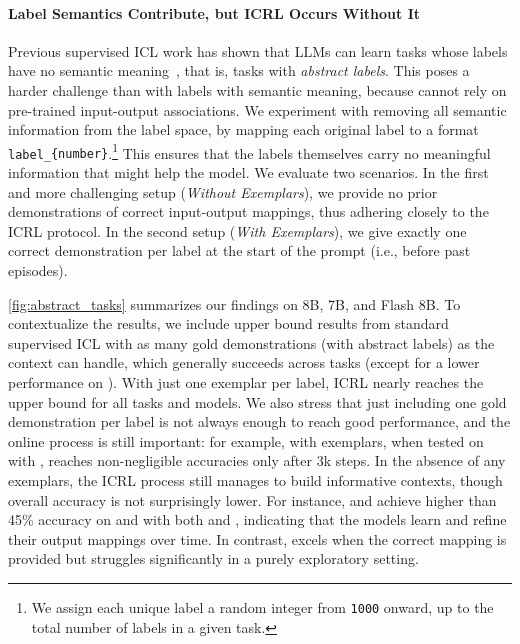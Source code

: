 \paragraph{Label Semantics Contribute, but ICRL Occurs Without It }
Previous supervised ICL work has shown that LLMs can learn tasks whose labels have no semantic meaning~\citep{pan-etal-2023-context, li2024languagemodelslearncontext}, that is, tasks with \textit{abstract labels}. 
This poses a harder challenge than with labels with semantic meaning, because cannot rely on pre-trained input-output associations. 
We experiment with removing all semantic information from the label space, by mapping each original label to a format \texttt{label\_{\{number\}}}.\footnote{We assign each unique label a random integer from \texttt{1000} onward, up to the total number of labels in a given task.} This ensures that the labels themselves carry no meaningful information that might help the model.
We evaluate two scenarios. In the first and more challenging setup (\textit{Without Exemplars}), we provide no prior demonstrations of correct input-output mappings, thus adhering closely to the ICRL protocol. In the second setup (\textit{With Exemplars}), we give exactly one correct demonstration per label at the start of the prompt (i.e., before past episodes). 



\autoref{fig:abstract_tasks} summarizes our findings on \llama 8B,  7B, and  Flash 8B. 
To contextualize the results, we include upper bound results from standard supervised ICL with as many gold demonstrations (with abstract labels) as the context can handle, which generally succeeds across tasks (except for a lower performance on \trecfine). 
With just one exemplar per label, ICRL nearly reaches the upper bound for all tasks and models. We also stress that just including one gold demonstration per label is not always enough to reach good performance, and the online process is still important: for example, \llama with exemplars, when tested on \clinic with \expshort, reaches non-negligible accuracies only after 3k steps.  In the absence of any exemplars, the ICRL process still manages to build informative contexts, though overall accuracy is not surprisingly lower. 
For instance, \qwen and \llama achieve higher than 45\% accuracy on \nlu and \trec with both \naiveplusshort and \expshort, indicating that the models learn and refine their output mappings over time. In contrast, \gemini excels when the correct mapping is provided but struggles significantly in a purely exploratory setting.

